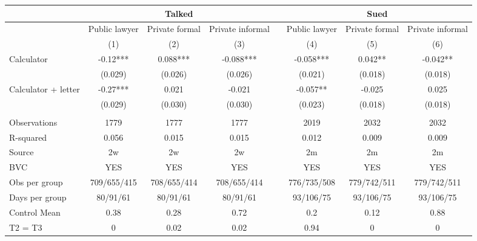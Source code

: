 \begin{tabular}{lccccccc}
\toprule
      & \multicolumn{3}{c}{Talked} &       & \multicolumn{3}{c}{Sued} \\
\midrule
\midrule
      & Public lawyer & Private formal & Private informal &       & Public lawyer & Private formal & Private informal \\
\cmidrule{2-4}\cmidrule{6-8}      & (1)   & (2)   & (3)   &       & (4)   & (5)   & (6) \\
\midrule
\midrule
Calculator & -0.12*** & 0.088*** & -0.088*** &       & -0.058*** & 0.042** & -0.042** \\
      & (0.029) & (0.026) & (0.026) &       & (0.021) & (0.018) & (0.018) \\
Calculator + letter & -0.27*** & 0.021 & -0.021 &       & -0.057** & -0.025 & 0.025 \\
      & (0.029) & (0.030) & (0.030) &       & (0.023) & (0.018) & (0.018) \\
      &       &       &       &       &       &       &  \\
\midrule
Observations & 1779  & 1777  & 1777  &       & 2019  & 2032  & 2032 \\
R-squared & 0.056 & 0.015 & 0.015 &       & 0.012 & 0.009 & 0.009 \\
Source & 2w    & 2w    & 2w    &       & 2m    & 2m    & 2m \\
BVC   & YES   & YES   & YES   &       & YES   & YES   & YES \\
Obs per group & 709/655/415 & 708/655/414 & 708/655/414 &       & 776/735/508 & 779/742/511 & 779/742/511 \\
Days per group & 80/91/61 & 80/91/61 & 80/91/61 &       & 93/106/75 & 93/106/75 & 93/106/75 \\
Control Mean & 0.38  & 0.28  & 0.72  &       & 0.2   & 0.12  & 0.88 \\
T2 = T3 & 0     & 0.02  & 0.02  &       & 0.94  & 0     & 0 \\
\bottomrule
\bottomrule
\end{tabular}%
